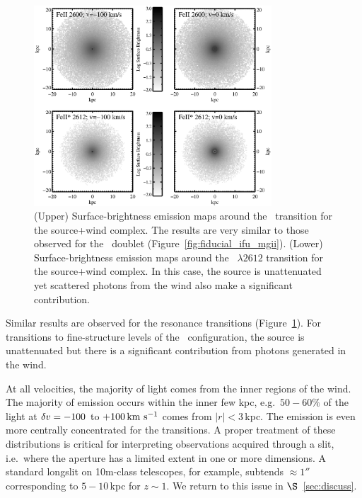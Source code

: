 \documentclass[]{emulateapj}
\begin{document}
\begin{figure}
\includegraphics[width=3.5in]{f7.eps}
\caption{
(Upper) Surface-brightness emission maps around the \feiib\ transition for the
source+wind complex.  
The results are very similar to those observed for the \mgiid\ doublet
(Figure~\ref{fig:fiducial_ifu_mgii}).
(Lower) Surface-brightness emission maps around the ~$\lambda
2612$ transition for the 
source+wind complex.  %
In this case, the source is unattenuated yet scattered photons from
the wind also make a significant contribution. 
}
\label{fig:fiducial_ifu_feii}
\end{figure}


Similar results are observed for the  resonance
transitions (Figure~\ref{fig:fiducial_ifu_feii}).
For transitions to fine-structure levels of the \aconfig\
configuration, the source
is unattenuated but there is a significant contribution from photons
generated in the wind. 

At all velocities, the majority of light comes from the inner regions
of the wind. 
The majority of
 emission occurs within the inner few kpc, e.g.\ $50-60\%$
of the light at $\delta v=-100$ to $+100 \, {\rm km~s^{-1}}$
comes from $|r| < 3$\,kpc.
The emission
is even more centrally concentrated for the  transitions.
A proper treatment of these
distributions is critical for interpreting observations
acquired through a slit, i.e.\ where the aperture has a limited extent
in one or more dimensions.  A standard longslit on 10m-class
telescopes, for example, subtends $\approx 1''$ corresponding to
$5-10$\,kpc for $z \sim 1$.    We return to this issue in
$\S$~\ref{sec:discuss}. 
\end{document}
